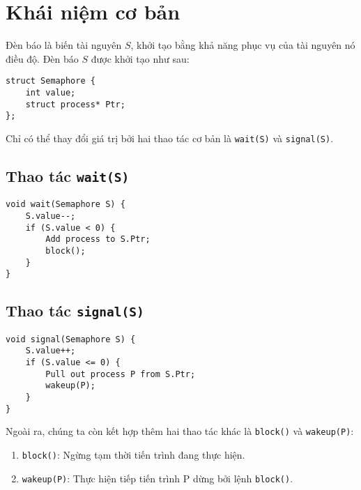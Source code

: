 \section{Khái niệm cơ bản}

Đèn báo là biến tài nguyên $S$, khởi tạo bằng khả năng phục vụ của tài nguyên nó điều độ. Đèn báo $S$ được khởi tạo như sau:

\begin{lstlisting}
struct Semaphore {
    int value;
    struct process* Ptr;
};
\end{lstlisting}

Chỉ có thể thay đổi giá trị bởi hai thao tác cơ bản là \texttt{wait(S)} và \texttt{signal(S)}.

\subsection*{Thao tác \texttt{wait(S)}}

\begin{lstlisting}
void wait(Semaphore S) {
    S.value--;
    if (S.value < 0) {
        Add process to S.Ptr;
        block();
    }
}
\end{lstlisting}

\subsection*{Thao tác \texttt{signal(S)}}

\begin{lstlisting}
void signal(Semaphore S) {
    S.value++;
    if (S.value <= 0) {
        Pull out process P from S.Ptr;
        wakeup(P);
    }
}
\end{lstlisting}

Ngoài ra, chúng ta còn kết hợp thêm hai thao tác khác là \texttt{block()} và \texttt{wakeup(P)}:

\begin{enumerate}
    \item \texttt{block()}: Ngừng tạm thời tiến trình đang thực hiện.
    \item \texttt{wakeup(P)}: Thực hiện tiếp tiến trình P dừng bởi lệnh \texttt{block()}.
\end{enumerate}


